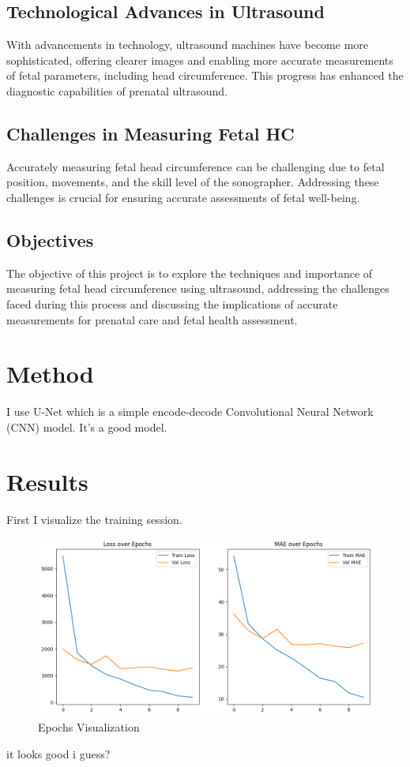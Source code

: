 \documentclass[conference]{IEEEtran}
\begin{document}
\subsection{Technological Advances in Ultrasound}
With advancements in technology, ultrasound machines have become more sophisticated, offering clearer images and enabling more accurate measurements of fetal parameters, including head circumference. This progress has enhanced the diagnostic capabilities of prenatal ultrasound.

\subsection{Challenges in Measuring Fetal HC}
Accurately measuring fetal head circumference can be challenging due to fetal position, movements, and the skill level of the sonographer. Addressing these challenges is crucial for ensuring accurate assessments of fetal well-being.

\subsection{Objectives}
The objective of this project is to explore the techniques and importance of measuring fetal head circumference using ultrasound, addressing the challenges faced during this process and discussing the implications of accurate measurements for prenatal care and fetal health assessment.

\section{Method}
I use U-Net which is a simple encode-decode Convolutional Neural Network (CNN) model. It's a good model.

\section{Results}
First I visualize the training session.
\begin{figure}[h]
    \centering
    \includegraphics[width=\linewidth]{eva1.png}
    \caption{Epochs Visualization}
    \label{fig:Epochs Visualization}
\end{figure}
it looks good i guess?
\end{document}
